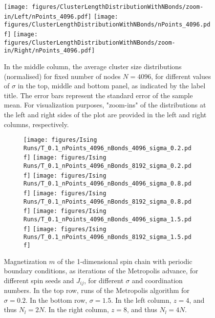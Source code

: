 \begin{figure}
		\centering
			\texttt{[image: figures/ClusterLengthDistributionWithNBonds/zoom-in/Left/nPoints\_4096.pdf]}
		\texttt{[image: figures/ClusterLengthDistributionWithNBonds/nPoints\_4096.pdf]}
			\texttt{[image: figures/ClusterLengthDistributionWithNBonds/zoom-in/Right/nPoints\_4096.pdf]}
	\caption{In the middle column, the average cluster size distributions (normalised) for fixed number of nodes $N=4096$, for different values of $\sigma$ in the top, middle and bottom panel, as indicated by the label title. The error bars represent the standard error of the sample mean. For visualization purposes, "zoom-ins" of the distributions at the left and right sides of the plot are provided in the left and right columns, respectively.}
	\label{fig:clusterLengthDistribution}
\end{figure}
\begin{figure}[p]
	\hspace{-2cm}
	\begin{subfigure}{1.3\textwidth}
	\texttt{[image: figures/Ising Runs/T\_0.1\_nPoints\_4096\_nBonds\_4096\_sigma\_0.2.pdf]}
	\texttt{[image: figures/Ising Runs/T\_0.1\_nPoints\_4096\_nBonds\_8192\_sigma\_0.2.pdf]}
	\texttt{[image: figures/Ising Runs/T\_0.1\_nPoints\_4096\_nBonds\_4096\_sigma\_0.8.pdf]}
	\texttt{[image: figures/Ising Runs/T\_0.1\_nPoints\_4096\_nBonds\_8192\_sigma\_0.8.pdf]}
	\texttt{[image: figures/Ising Runs/T\_0.1\_nPoints\_4096\_nBonds\_4096\_sigma\_1.5.pdf]}
	\texttt{[image: figures/Ising Runs/T\_0.1\_nPoints\_4096\_nBonds\_8192\_sigma\_1.5.pdf]}
	\end{subfigure}
	\caption{ Magnetization $m$ of the 1-dimensional spin chain with periodic boundary conditions, as iterations of the Metropolis advance, for different spin seeds and $J_{ij}$, for different $\sigma$ and coordination numbers. In the top row, runs of the Metropolis algorithm for $\sigma = 0.2$. In the bottom row, $\sigma = 1.5$. In the left column,  $z = 4$, and thus  $N_l = 2N$. In the right column,  $z = 8$, and thus $N_l = 4N$.}
	\label{fig:magnetization}
\end{figure}
